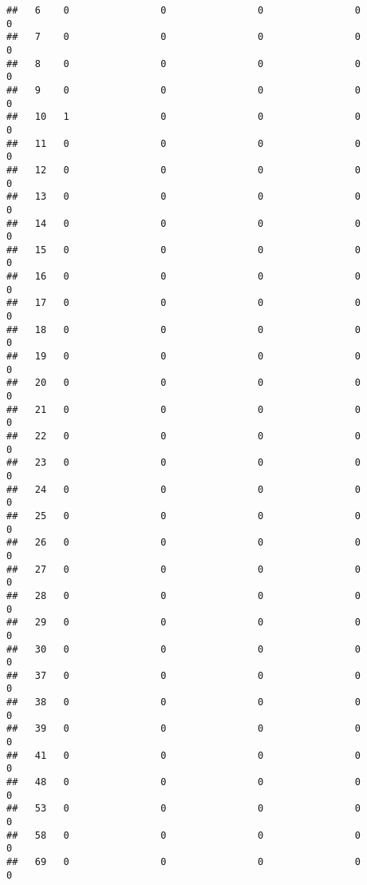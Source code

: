 \documentclass[]{article}
\begin{document}
\begin{verbatim}
##   6    0                0                0                0                0
##   7    0                0                0                0                0
##   8    0                0                0                0                0
##   9    0                0                0                0                0
##   10   1                0                0                0                0
##   11   0                0                0                0                0
##   12   0                0                0                0                0
##   13   0                0                0                0                0
##   14   0                0                0                0                0
##   15   0                0                0                0                0
##   16   0                0                0                0                0
##   17   0                0                0                0                0
##   18   0                0                0                0                0
##   19   0                0                0                0                0
##   20   0                0                0                0                0
##   21   0                0                0                0                0
##   22   0                0                0                0                0
##   23   0                0                0                0                0
##   24   0                0                0                0                0
##   25   0                0                0                0                0
##   26   0                0                0                0                0
##   27   0                0                0                0                0
##   28   0                0                0                0                0
##   29   0                0                0                0                0
##   30   0                0                0                0                0
##   37   0                0                0                0                0
##   38   0                0                0                0                0
##   39   0                0                0                0                0
##   41   0                0                0                0                0
##   48   0                0                0                0                0
##   53   0                0                0                0                0
##   58   0                0                0                0                0
##   69   0                0                0                0                0

\end{verbatim}
\end{document}
